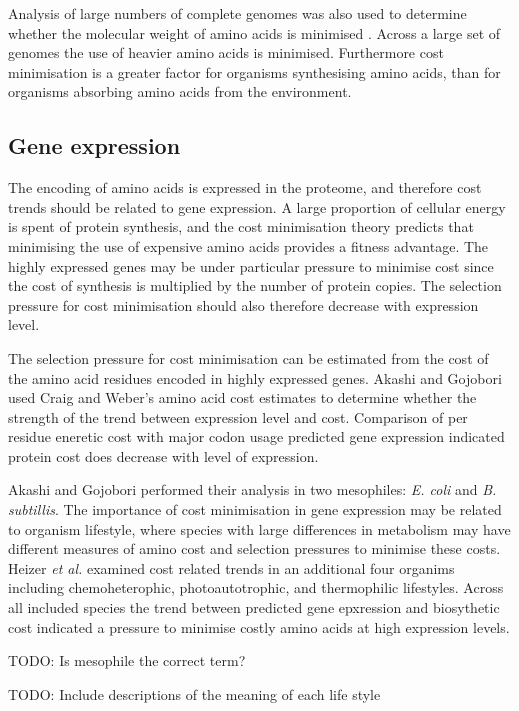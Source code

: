 Analysis of large numbers of complete genomes was also used to determine whether the molecular weight of amino acids is minimised \cite{seligmann2002}. Across a large set of genomes the use of heavier amino acids is minimised. Furthermore cost minimisation is a greater factor for organisms synthesising amino acids, than for organisms absorbing amino acids from the environment.

\subsection{Gene expression}

The encoding of amino acids is expressed in the proteome, and therefore cost trends should be related to gene expression. A large proportion of cellular energy is spent of protein synthesis, and the cost minimisation theory predicts that minimising the use of expensive amino acids provides a fitness advantage. The highly expressed genes may be under particular pressure to minimise cost since the cost of synthesis is multiplied by the number of protein copies. The selection pressure for cost minimisation should also therefore decrease with expression level.

The selection pressure for cost minimisation can be estimated from the cost of the amino acid residues encoded in highly expressed genes. Akashi and Gojobori \cite{akashi2002} used Craig and Weber's amino acid cost estimates \cite{craig1998} to determine whether the strength of the trend between expression level and cost. Comparison of per residue eneretic cost with major codon usage predicted gene expression \cite{kanaya1999} indicated protein cost does decrease with level of expression.

Akashi and Gojobori performed their analysis in two mesophiles: \emph{E. coli} and \emph{B. subtillis}. The importance of cost minimisation in gene expression may be related to organism lifestyle, where species with large differences in metabolism may have different measures of amino cost and selection pressures to minimise these costs. Heizer \emph{et al.} \cite{heizer2006} examined cost related trends in an additional four organims including chemoheterophic, photoautotrophic, and thermophilic lifestyles. Across all included species the trend between predicted gene epxression and biosythetic cost indicated a pressure to minimise costly amino acids at high expression levels.

TODO: Is mesophile the correct term?

TODO: Include descriptions of the meaning of each life style

